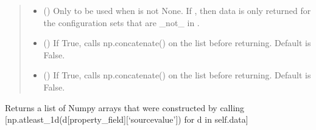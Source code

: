 \documentclass[letterpaper,10pt,english]{sphinxmanual}
\begin{document}
\begin{fulllineitems}
\begin{fulllineitems}
\begin{quote}
\begin{description}
\begin{itemize}
\sphinxAtStartPar
If  is a base dataset, then  should be a list of
integers used for indexing .

\sphinxAtStartPar
If  is a parent dataset, then  should be a list of
2\sphinxhyphen{}tuples  where a configuration set will be indexed
using .


\item {} 
\sphinxAtStartPar
{} () \textendash{} Only to be used when  is not None. If ,
then data is only returned for the configuration sets that are
\_not\_ in .

\item {} 
\sphinxAtStartPar
{} () \textendash{} If True, calls np.concatenate() on the list before returning.
Default is False.

\item {} 
\sphinxAtStartPar
{} () \textendash{} If True, calls np.concatenate() on the list before returning.
Default is False.

\end{itemize}

\end{description}\end{quote}

\sphinxAtStartPar
Returns a list of Numpy arrays that were constructed by calling
{[}np.atleast\_1d(d{[}property\_field{]}{[}‘source\sphinxhyphen{}value’{]}) for d in self.data{]}

\end{fulllineitems}



\end{fulllineitems}
\end{document}
